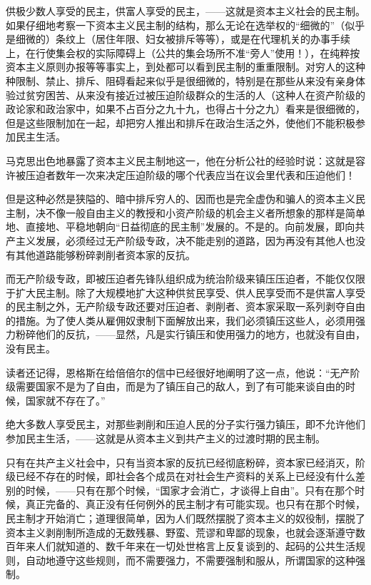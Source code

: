 供极少数人享受的民主，供富人享受的民主，——这就是资本主义社会的民主制。如果仔细地考察一下资本主义民主制的结构，那么无论在选举权的“细微的”（似乎是细微的）条纹上（居住年限、妇女被排斥等等），或是在代理机关的办事手续上，在行使集会权的实际障碍上（公共的集会场所不准“旁人”使用！），在纯粹按资本主义原则办报等等事实上，到处都可以看到民主制的重重限制。对穷人的这种种限制、禁止、排斥、阻碍看起来似乎是很细微的，特别是在那些从来没有亲身体验过贫穷困苦、从来没有接近过被压迫阶级群众的生活的人（这种人在资产阶级的政论家和政治家中，如果不占百分之九十九，也得占十分之九）看来是很细微的，但是这些限制加在一起，却把穷人推出和排斥在政治生活之外，使他们不能积极参加民主生活。

马克思出色地暴露了资本主义民主制地这一，他在分析公社的经验时说：这就是容许被压迫者数年一次来决定压迫阶级的哪个代表应当在议会里代表和压迫他们！

但是这种必然是狭隘的、暗中排斥穷人的、因而也是完全虚伪和骗人的资本主义民主制，决不像一般自由主义的教授和小资产阶级的机会主义者所想象的那样是简单地、直接地、平稳地朝向“日益彻底的民主制”发展的。不是的。向前发展，即向共产主义发展，必须经过无产阶级专政，决不能走别的道路，因为再没有其他人也没有其他道路能够{\kaishu 粉碎}剥削者资本家的{\kaishu 反抗}。

而无产阶级专政，即被压迫者先锋队组织成为统治阶级来镇压压迫者，不能仅仅限于扩大民主制。{\kaishu 除了}大规模地扩大这种供贫民享受、供人民享受而不是供富人享受的民主制{\kaishu 之外}，无产阶级专政还要对压迫者、剥削者、资本家采取一系列剥夺自由的措施。为了使人类从雇佣奴隶制下面解放出来，我们必须镇压这些人，必须用强力粉碎他们的反抗，——显然，凡是实行镇压和使用强力的地方，也就没有自由，没有民主。

读者还记得，恩格斯在给倍倍尔的信中已经很好地阐明了这一点，他说：“无产阶级需要国家不是为了自由，而是为了镇压自己的敌人，到了有可能来谈自由的时候，国家就不存在了。”

绝大多数人享受民主，对那些剥削和压迫人民的分子实行强力镇压，即不允许他们参加民主生活，——这就是从资本主义到共产主义的{\kaishu 过渡}时期的民主制。

只有在共产主义社会中，只有当资本家的反抗已经彻底粉碎，资本家已经消灭，阶级已经不存在的时候，即社会各个成员在对社会生产资料的关系上已经没有什么差别的时候，——{\kaishu 只有}在那个时候，“{\heiti 国家才会消亡，才谈得上自由}”。只有在那个时候，真正完备的、真正没有任何例外的民主制才有可能实现。也只有在那个时候，民主制才开始{\kaishu 消亡}；道理很简单，因为人们既然摆脱了资本主义的奴役制，摆脱了资本主义剥削制所造成的无数残暴、野蛮、荒谬和卑鄙的现象，也就会逐渐遵守数百年来人们就知道的、数千年来在一切处世格言上反复谈到的、起码的公共生活规则，自动地遵守这些规则，而不需要强力，不需要强制和服从，所谓国家的这种强制。

